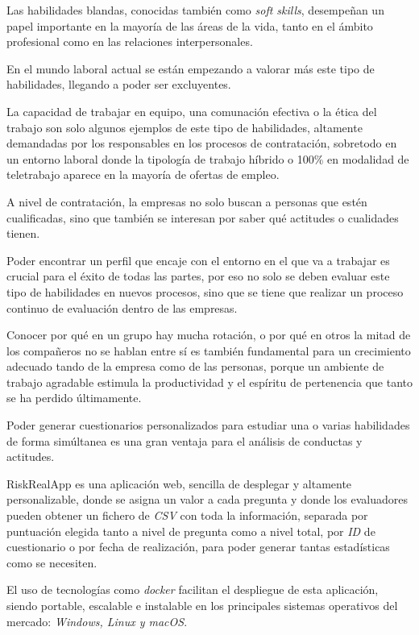 
Las habilidades blandas, conocidas también como \textit{soft skills}, desempeñan un papel importante en la mayoría de las áreas de la vida, tanto en el ámbito profesional como en las relaciones interpersonales.

En el mundo laboral actual se están empezando a valorar más este tipo de habilidades, llegando a poder ser excluyentes. 

La capacidad de trabajar en equipo, una comunación efectiva o la ética del trabajo son solo algunos ejemplos de este tipo de habilidades, altamente demandadas por los responsables en los procesos de contratación, sobretodo en un entorno laboral donde la tipología de trabajo híbrido o 100\% en modalidad de teletrabajo aparece en la mayoría de ofertas de empleo.

A nivel de contratación, la empresas no solo buscan a personas que estén cualificadas, sino que también se interesan por saber qué actitudes o cualidades tienen.

Poder encontrar un perfil que encaje con el entorno en el que va a trabajar es crucial para el éxito de todas las partes, por eso no solo se deben evaluar este tipo de habilidades en nuevos procesos, sino que se tiene que realizar un proceso continuo de evaluación dentro de las empresas.

Conocer por qué en un grupo hay mucha rotación, o por qué en otros la mitad de los compañeros no se hablan entre sí es también fundamental para un crecimiento adecuado tando de la empresa como de las personas, porque un ambiente de trabajo agradable estimula la productividad y el espíritu de pertenencia que tanto se ha perdido últimamente.

Poder generar cuestionarios personalizados para estudiar una o varias habilidades de forma simúltanea es una gran ventaja para el análisis de conductas y actitudes.

RiskRealApp es una aplicación web, sencilla de desplegar y altamente personalizable, donde se asigna un valor a cada pregunta y donde los evaluadores pueden obtener un fichero de \textit{CSV} con toda la información, separada por puntuación elegida tanto a nivel de pregunta como a nivel total, por \textit{ID} de cuestionario o por fecha de realización, para poder generar tantas estadísticas como se necesiten.

El uso de tecnologías como \textit{docker} facilitan el despliegue de esta aplicación, siendo portable, escalable e instalable en los principales sistemas operativos del mercado: \textit{Windows, Linux y macOS}.

